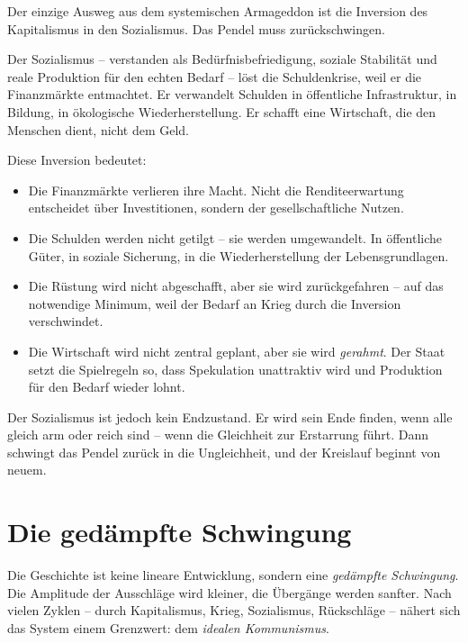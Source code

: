 \documentclass[12pt,a4paper]{book}
\begin{document}
Der einzige Ausweg aus dem systemischen Armageddon ist die Inversion des Kapitalismus in den Sozialismus. Das Pendel muss zurückschwingen.

Der Sozialismus – verstanden als Bedürfnisbefriedigung, soziale Stabilität und reale Produktion für den echten Bedarf – löst die Schuldenkrise, weil er die Finanzmärkte entmachtet. Er verwandelt Schulden in öffentliche Infrastruktur, in Bildung, in ökologische Wiederherstellung. Er schafft eine Wirtschaft, die den Menschen dient, nicht dem Geld.

Diese Inversion bedeutet:

\begin{itemize}
    \item Die Finanzmärkte verlieren ihre Macht. Nicht die Renditeerwartung entscheidet über Investitionen, sondern der gesellschaftliche Nutzen.
    \item Die Schulden werden nicht getilgt – sie werden umgewandelt. In öffentliche Güter, in soziale Sicherung, in die Wiederherstellung der Lebensgrundlagen.
    \item Die Rüstung wird nicht abgeschafft, aber sie wird zurückgefahren – auf das notwendige Minimum, weil der Bedarf an Krieg durch die Inversion verschwindet.
    \item Die Wirtschaft wird nicht zentral geplant, aber sie wird \emph{gerahmt}. Der Staat setzt die Spielregeln so, dass Spekulation unattraktiv wird und Produktion für den Bedarf wieder lohnt.
\end{itemize}

Der Sozialismus ist jedoch kein Endzustand. Er wird sein Ende finden, wenn alle gleich arm oder reich sind – wenn die Gleichheit zur Erstarrung führt. Dann schwingt das Pendel zurück in die Ungleichheit, und der Kreislauf beginnt von neuem.

\chapter{Die gedämpfte Schwingung}

Die Geschichte ist keine lineare Entwicklung, sondern eine \emph{gedämpfte Schwingung}. Die Amplitude der Ausschläge wird kleiner, die Übergänge werden sanfter. Nach vielen Zyklen – durch Kapitalismus, Krieg, Sozialismus, Rückschläge – nähert sich das System einem Grenzwert: dem \emph{idealen Kommunismus}.
\end{document}
